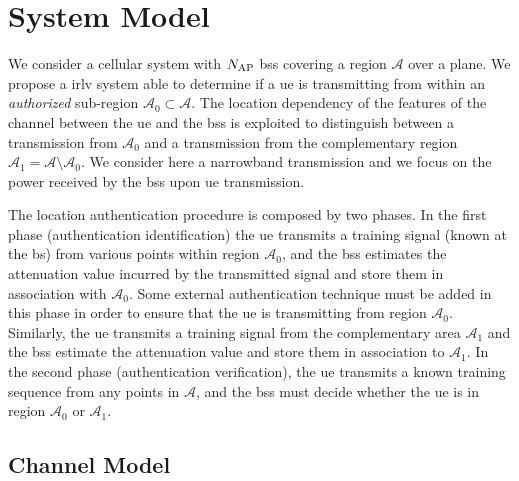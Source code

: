 \documentclass[twocolumns]{IEEEtran}
\begin{document}
\section{System Model}\label{sec:sys model}


We consider a cellular system with $N_{\rm AP}$ \acp{bs} covering a region $\mathcal{A}$ over a plane. We propose a \ac{irlv} system able to determine if a \ac{ue} is transmitting from within an {\em authorized} sub-region $\mathcal{A}_0 \subset \mathcal{A}$. The location dependency of the features of the channel between the \ac{ue} and the \acp{bs} is exploited to distinguish between a transmission from $\mathcal{A}_0$ and a transmission from the complementary region $\mathcal{A}_1=\mathcal{A} \setminus \mathcal{A}_0$. We consider here a narrowband transmission and we focus on the power received by the \acp{bs} upon \ac{ue} transmission.

The location authentication procedure is composed by two phases. In the first phase (authentication identification) the \ac{ue} transmits a training signal (known at the \acs{bs}) from various points within region $\mathcal{A}_0$, and the \acp{bs} estimates the attenuation value incurred by the transmitted signal and store them in association with $\mathcal{A}_0$. Some external authentication technique must be added in this phase in order to ensure that the \ac{ue} is transmitting from region $\mathcal{A}_0$. Similarly, the \ac{ue} transmits a training signal from the complementary area $\mathcal{A}_1$ and the \acp{bs} estimate the attenuation value and store them in association to $\mathcal{A}_1$. In the second phase (authentication verification), the \ac{ue} transmits a known training sequence from any points in $\mathcal{A}$, and the \acp{bs} must decide whether the \ac{ue} is in region $\mathcal{A}_0$ or $\mathcal{A}_1$.


\subsection{Channel Model}
\end{document}
